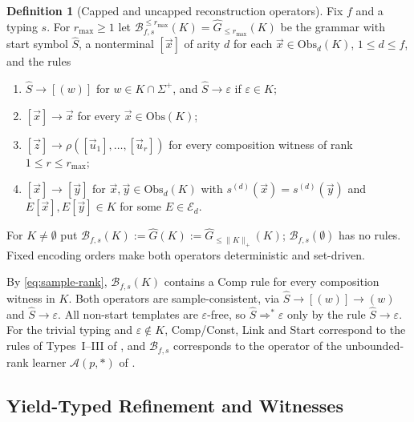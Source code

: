 \documentclass[11pt]{article}
\numberwithin{equation}{section}
\theoremstyle{plain}
\theoremstyle{definition}
\newtheorem{definition}[theorem]{Definition}
\theoremstyle{remark}
\newcommand{\tuple}[1]{\vec{#1}}
\newcommand{\eps}{\varepsilon}
\theoremstyle{plain}
\begin{document}
\begin{definition}[Capped and uncapped reconstruction operators]
\label{def:reconstruction}
Fix $f$ and a typing $s$.  For $r_{\max}\ge1$ let
$\mathcal B_{f,s}^{\le r_{\max}}(K)=\widehat G_{\le r_{\max}}(K)$ be the
grammar with start symbol $\widehat S$, a nonterminal $[\tuple x]$ of arity
$d$ for each $\tuple x\in\mathrm{Obs}_d(K)$, $1\le d\le f$, and the rules
\begin{enumerate}[leftmargin=*]
\item[\textnormal{(Start)}] $\widehat S\to[(w)]$ for $w\in K\cap\Sigma^+$, and
      $\widehat S\to\eps$ if $\eps\in K$;
\item[\textnormal{(Const)}] $[\tuple x]\to\tuple x$ for every
      $\tuple x\in\mathrm{Obs}(K)$;
\item[\textnormal{(Comp)}] $[\tuple z]\to\rho([\tuple u_1],\ldots,[\tuple u_r])$
      for every composition witness of rank $1\le r\le r_{\max}$;
\item[\textnormal{(Link)}] $[\tuple x]\to[\tuple y]$ for
      $\tuple x,\tuple y\in\mathrm{Obs}_d(K)$ with
      $s^{(d)}(\tuple x)=s^{(d)}(\tuple y)$ and $E[\tuple x],E[\tuple y]\in K$
      for some $E\in\mathcal E_d$.
\end{enumerate}
For $K\ne\emptyset$ put $\mathcal B_{f,s}(K):=\widehat G(K):=
\widehat G_{\le\|K\|_+}(K)$; $\mathcal B_{f,s}(\emptyset)$ has no rules.
Fixed encoding orders make both operators deterministic and set-driven.
\end{definition}

By \eqref{eq:sample-rank}, $\mathcal B_{f,s}(K)$ contains a Comp rule for every
composition witness in $K$.  Both operators are sample-consistent, via
$\widehat S\to[(w)]\to(w)$ and $\widehat S\to\eps$.  All non-start templates
are $\eps$-free, so $\widehat S\Rightarrow^*\eps$ only by the rule
$\widehat S\to\eps$.  For the trivial typing and $\eps\notin K$, Comp/Const, Link
and Start correspond to the rules of Types~I--III of
\cite[Section~4.1]{Yoshinaka2011}, and $\mathcal B_{f,s}$ corresponds to the
operator of the unbounded-rank learner
$\mathcal A(p,*)$ of \cite[Corollary~2]{Yoshinaka2011}.

\subsection{Yield-Typed Refinement and Witnesses}
\label{sec:refinement}
\end{document}
